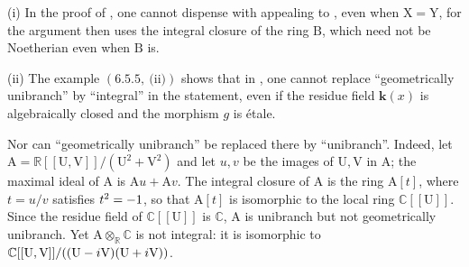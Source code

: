 \begin{remarks}[6.15.11]
\label{IV.6.15.11}
(i) In the proof of , one cannot dispense with
appealing to , even when $\mathrm{X}=\mathrm{Y}$, for the argument then
uses the integral closure of the ring $\mathrm{B}$, which need not be Noetherian even
when $\mathrm{B}$ is.

(ii) The example $(6.5.5,~\text{(ii)})$ shows that in , one cannot replace
``geometrically unibranch'' by ``integral'' in the statement, even if the residue field
$\boldsymbol{k}(x)$ is algebraically closed and the morphism $g$ is \'etale.

Nor can ``geometrically unibranch'' be replaced there by ``unibranch''.
Indeed, let $\mathrm{A}=\mathbb{R}[[\mathrm{U},\mathrm{V}]]/(\mathrm{U}^2+\mathrm{V}^2)$
and let $u,v$ be the images of $\mathrm{U},\mathrm{V}$ in $\mathrm{A}$; the maximal
ideal of $\mathrm{A}$ is $\mathrm{A}u+\mathrm{A}v$.
The integral closure of $\mathrm{A}$ is the ring $\mathrm{A}[t]$, where $t=u/v$
satisfies $t^2=- 1$, so that $\mathrm{A}[t]$ is isomorphic to the local ring
$\mathbb{C}[[\mathrm{U}]]$.
Since the residue field of $\mathbb{C}[[\mathrm{U}]]$ is $\mathbb{C}$,
$\mathrm{A}$ is unibranch but not geometrically unibranch.
Yet $\mathrm{A}\otimes_{\mathbb{R}}\mathbb{C}$ is not integral: it is isomorphic to $\mathbb{C}[[\mathrm{U},\mathrm{V}]]/
((\mathrm{U}- i\mathrm{V})(\mathrm{U}+i\mathrm{V}))$.
\end{remarks}
